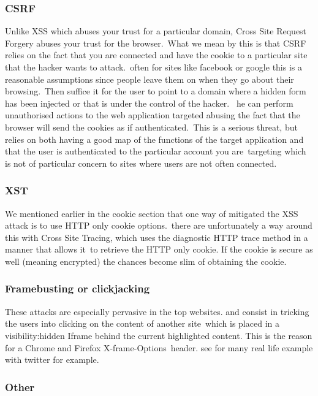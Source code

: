 \documentclass[a4paper,12pt]{paper}
\begin{document}
\subsubsection{CSRF}

Unlike XSS which abuses your trust for a particular domain, Cross Site Request Forgery abuses your trust for the browser.\
What we mean by this is that CSRF relies on the fact that you are connected and have the cookie to a particular site that the hacker wants to attack.\
often for sites like facebook or google this is a reasonable assumptions since people leave them on when they go about their browsing.\ Then suffice it for the user
to point to a domain where a hidden form has been injected or that is under the control of the hacker. \
he can perform unauthorised actions to the web application targeted abusing the fact that the browser will send the cookies as if authenticated.\
This is a serious threat, but relies on both having a good map of the functions of the target application and that the user is authenticated to the particular account you are\
targeting which is not of particular concern to sites where users are not often connected.

\subsubsection{XST}

We mentioned earlier in the cookie section that one way of mitigated the XSS attack is to use HTTP only cookie options.\
there are unfortunately a way around this with Cross Site Tracing, which uses the diagnostic HTTP trace method in a manner that allows it\
to retrieve the HTTP only cookie. If the cookie is secure as well (meaning encrypted) the chances become slim of obtaining the cookie.\


\subsubsection{Framebusting or clickjacking}

These attacks are especially pervasive in the top websites. and consist in tricking the users into clicking on the content of another site\
which is placed in a visibility:hidden Iframe behind the current highlighted content. This is the reason for a Chrome and Firefox X-frame-Options\
header. see \cite{buster} for many real life example with twitter for example.

\subsubsection{Other}
\end{document}
